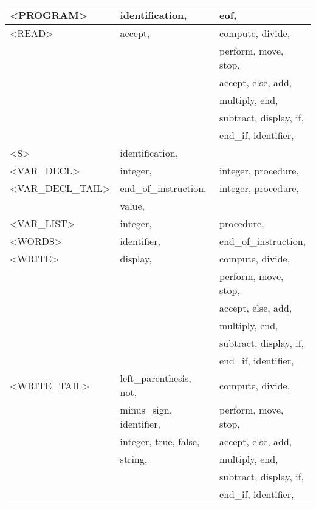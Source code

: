 \begin{longtable}{|l|l|l|}
  \hline
<PROGRAM>  &  identification, &   eof, \\ 
  \hline
<READ>  &  accept, &   compute, divide, \\ 
  &  &   perform, move, stop, \\ 
  &  &   accept, else, add, \\ 
  &  &   multiply, end, \\ 
  &  &   subtract, display, if, \\ 
  &  &   end\_if, identifier, \\ 
  \hline
<S>  &  identification, &   \\ 
  \hline
<VAR\_DECL>  &  integer, &   integer, procedure, \\ 
  \hline
<VAR\_DECL\_TAIL>  &  end\_of\_instruction, &   integer, procedure, \\ 
  &  value, &   \\ 
  \hline
<VAR\_LIST>  &  integer, &   procedure, \\ 
  \hline
<WORDS>  &  identifier, &   end\_of\_instruction, \\ 
  \hline
<WRITE>  &  display, &   compute, divide, \\ 
  &  &   perform, move, stop, \\ 
  &  &   accept, else, add, \\ 
  &  &   multiply, end, \\ 
  &  &   subtract, display, if, \\ 
  &  &   end\_if, identifier, \\ 
  \hline
<WRITE\_TAIL>  &  left\_parenthesis, not, &   compute, divide, \\ 
  &  minus\_sign, identifier, &   perform, move, stop, \\ 
  &  integer, true, false, &   accept, else, add, \\ 
  &  string, &   multiply, end, \\ 
  &  &   subtract, display, if, \\ 
  &  &   end\_if, identifier, \\ 
  \hline
  
  \end{longtable}
